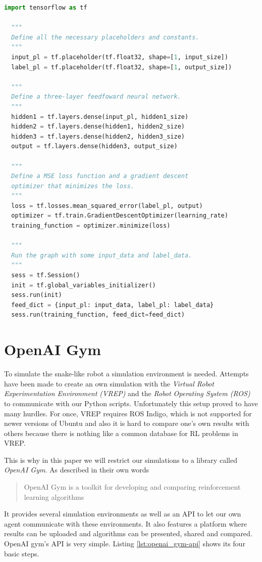 \begin{minipage}{\linewidth}
\begin{lstlisting}[language=Python, caption=Example TF code for more complex computations, captionpos=b, label=lst:nn-example]
  import tensorflow as tf

  """
  Define all the necessary placeholders and constants.
  """
  input_pl = tf.placeholder(tf.float32, shape=[1, input_size])
  label_pl = tf.placeholder(tf.float32, shape=[1, output_size])

  """
  Define a three-layer feedfoward neural network.
  """
  hidden1 = tf.layers.dense(input_pl, hidden1_size)
  hidden2 = tf.layers.dense(hidden1, hidden2_size)
  hidden3 = tf.layers.dense(hidden2, hidden3_size)
  output = tf.layers.dense(hidden3, output_size)

  """
  Define a MSE loss function and a gradient descent
  optimizer that minimizes the loss.
  """
  loss = tf.losses.mean_squared_error(label_pl, output)
  optimizer = tf.train.GradientDescentOptimizer(learning_rate)
  training_function = optimizer.minimize(loss)

  """
  Run the graph with some input_data and label_data.
  """
  sess = tf.Session()
  init = tf.global_variables_initializer()
  sess.run(init)
  feed_dict = {input_pl: input_data, label_pl: label_data}
  sess.run(training_function, feed_dict=feed_dict)
\end{lstlisting}
\end{minipage}


\section{OpenAI Gym}

To simulate the snake-like robot a simulation environment is needed.
Attempts have been made to create an own simulation with the \emph{Virtual Robot Experimentation Environment (VREP)} and the \emph{Robot Operating System (ROS)} to communicate with our Python scripts.
Unfortunately this setup proved to have many hurdles.
For once, VREP requires ROS Indigo, which is not supported for newer versions of Ubuntu and also it is hard to compare one's own results with others because there is nothing like a common database for RL problems in VREP.


This is why in this paper we will restrict our simulations to a library called \emph{OpenAI Gym}.
As described in their own words \blockquote[{\cite[1]{openai_gym}}]{OpenAI Gym is a toolkit for developing and comparing reinforcement learning algorithms}.
It provides several simulation environments as well as an API to let our own agent communicate with these environments.
It also features a platform where results can be uploaded and algorithms can be presented, shared and compared.
OpenAI gym's API is very simple. Listing \ref{lst:openai_gym-api} shows its four basic steps.

